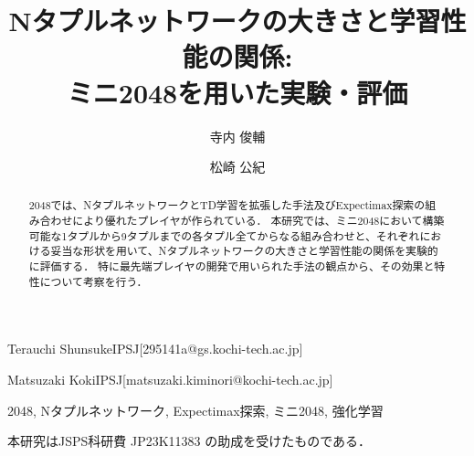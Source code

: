 \documentclass[techrep,submit,noauthor,platex,dvipdfmx]{ipsj}
\begin{document}
\title{Nタプルネットワークの大きさと学習性能の関係:\\ミニ2048を用いた実験・評価}





\author{寺内 俊輔}{Terauchi Shunsuke}{IPSJ}[295141a@gs.kochi-tech.ac.jp]
\author{松崎 公紀}{Matsuzaki Koki}{IPSJ}[matsuzaki.kiminori@kochi-tech.ac.jp]

\begin{abstract}
    2048では、NタプルネットワークとTD学習を拡張した手法及びExpectimax探索の組み合わせにより優れたプレイヤが作られている．
    本研究では、ミニ2048において構築可能な1タプルから9タプルまでの各タプル全てからなる組み合わせと、それぞれにおける妥当な形状を用いて、Nタプルネットワークの大きさと学習性能の関係を実験的に評価する．
    特に最先端プレイヤの開発で用いられた手法の観点から、その効果と特性について考察を行う．
\end{abstract}


\begin{jkeyword}
2048, Nタプルネットワーク, Expectimax探索, ミニ2048, 強化学習
\end{jkeyword}


\maketitle







\begin{acknowledgment}
    本研究はJSPS科研費 JP23K11383 の助成を受けたものである．
\end{acknowledgment}

\def\newblock{}

% 


\end{document}
